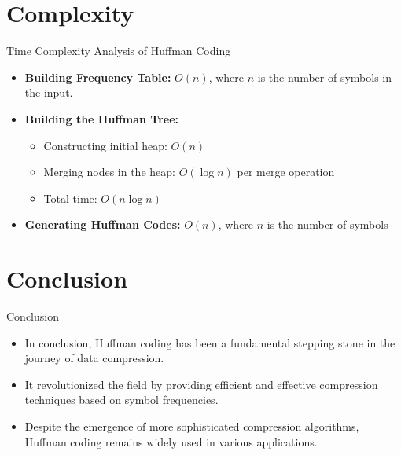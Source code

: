 \documentclass{beamer}
\begin{document}
\section{Complexity}

\begin{frame}{Time Complexity Analysis of Huffman Coding}
	\begin{itemize}
		\item \textbf{Building Frequency Table:} \(O(n)\), where \(n\) is the number of symbols in the input.
		\item \textbf{Building the Huffman Tree:} 
		\begin{itemize}
			\item Constructing initial heap: \(O(n)\)
			\item Merging nodes in the heap: \(O(\log n)\) per merge operation
			\item Total time: \(O(n \log n)\)
		\end{itemize}
		\item \textbf{Generating Huffman Codes:} \(O(n)\), where \(n\) is the number of symbols
	\end{itemize}
	
	\vspace{0.5cm}
	
\end{frame}





\section{Conclusion}


\begin{frame}{Conclusion}
	\begin{itemize}
		\item In conclusion, Huffman coding has been a fundamental stepping stone in the journey of data compression.
		\item It revolutionized the field by providing efficient and effective compression techniques based on symbol frequencies.
		\item Despite the emergence of more sophisticated compression algorithms, Huffman coding remains widely used in various applications.
	\end{itemize}
\end{frame}
\end{document}
